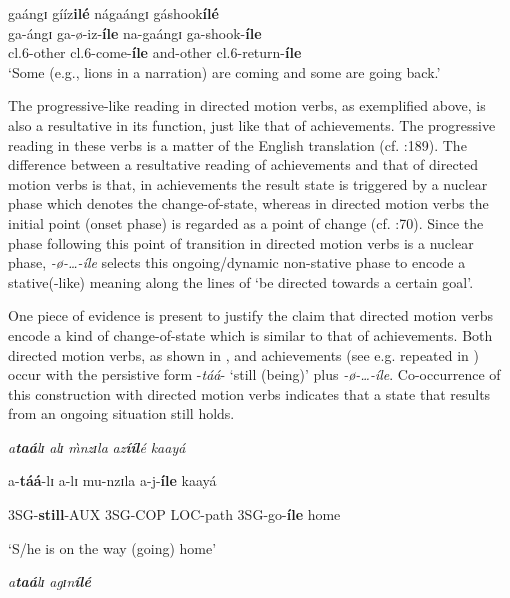 \documentclass[output=paper]{langscibook}
\begin{document}
\ex 
  gaángɪ     gííz\textbf{ilé}  nágaángɪ  gáshook\textbf{ílé}\\
 ga-ángɪ     ga-ø-iz-\textbf{íle}      na-gaángɪ  ga-shook-\textbf{íle}\\
 cl.6-other  cl.6-come-\textbf{íle} and-other   cl.6-return-\textbf{íle}\\
\glt ‘Some (e.g., lions in a narration) are coming and some are going back.’
\z
\z

The progressive-like reading in directed motion verbs, as exemplified above, is also a resultative in its function, just like that of achievements. The progressive reading in these verbs is a matter of the English translation (cf. \citealt{Ebert1995}:189). The difference between a resultative reading of achievements and that of directed motion verbs is that, in achievements the result state is triggered by a nuclear phase which denotes the change-of-state, whereas in directed motion verbs the initial point (onset phase) is regarded as a point of change (cf. \citealt{Smith1991}:70). Since the phase following this point of transition in directed motion verbs is a nuclear phase, \textit{-ø}\textit{-…-íle} selects this ongoing/dynamic non-stative phase to encode a stative(-like) meaning along the lines of ‘be directed towards a certain goal’. 

One piece of evidence is present to justify the claim that directed motion verbs encode a kind of change-of-state which is similar to that of achievements. Both directed motion verbs, as shown in , and achievements (see e.g.  repeated in ) occur with the persistive form -\textit{táá}- ‘still (being)’ plus \textit{-ø}\textit{-…-íle}. Co-occurrence of this construction with directed motion verbs indicates that a state that results from an ongoing situation still holds.

\ea
\textit{a}\textbf{\textit{taá}}\textit{lɪ}             \textit{alɪ}            \textit{\`{m}nz}\textit{ɪla}      \textit{az}\textbf{\textit{ííl}}\textit{é}         \textit{kaayá}

  a-\textbf{táá}-lɪ           a-lɪ           mu-nzɪla  a-j-\textbf{íle}        kaayá

  3SG-\textbf{still}-AUX 3SG-COP LOC-path 3SG-go-\textbf{íle} home

  ‘S/he is on the way (going) home’
\z

\ea
\textit{a}\textbf{\textit{taá}}\textit{lɪ}              \textit{agɪ}\textit{n}\textbf{\textit{ílé}} 
 
\end{document}
